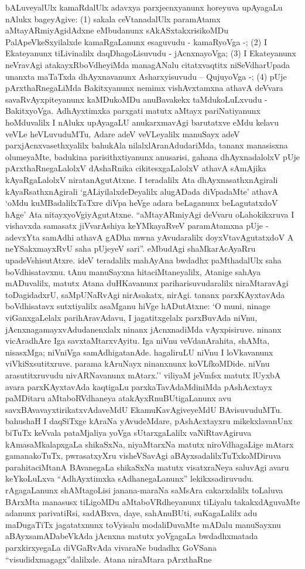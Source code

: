 bALuveyalUlx kamaRdalUlx adavxya parxjecnxyanunx horeyuva upAyagaLu nAlukx bageyAgive: {\rm(1)} sakala ceVtanadalUlx paramAtamx aMtayARmiyAgidAdxne eMbudanunx sAkASxtakxrisikoMDu PalApeVkeSxyilalxde kamaRgaLanunx esaguvudu - kamaRyoVga -; {\rm(2)} I Ekateyanunx tiLivinalilx daqDhagoLisuvudu - jAcnxnayoVga; {\rm(3)} I Ekateyanunx neVravAgi atakayxRboVdheyiMda managANalu citatxvaqtitx niSeVdharUpada unanxta maTaTxda dhAyxnavanunx Asharxyisuvudu -- QujuyoVga -; {\rm(4)} pUje pArxthaRnegaLiMda Bakitxyanunx nemimx vishAvxtamxna athavA deVvara savaRvAyxpiteyanunx kaMDukoMDu anuBavakekx taMdukoLuLxvudu - BakitxyoVga. AdhAyxtimxka parxgati matutx aMtayx pariNatiyanunx hoMduvalilx I nAlukx upAyagaLU anukarxmavAgi barutatxve eMdu kelavu veVLe heVLuvuduMTu, Adare adeV veVLeyalilx manuSayx adeV parxjAcnxvasethxyalilx bahukAla nilalxlAranAdudariMda, tananx manasisxna olumeyaMte, badukina parisithxtiyanunx anusarisi, gahana dhAyxnadalolxV pUje pArxthaRnegaLalolxV dAshaRnika cikitesxgaLalolxV athavA sAmAjika kAyaRgaLalolxV niratanAgutAtxne. I teradalilx Ata dhAyxnasathxnAgirali kAyaRsathxnAgirali `gALiyilalxdeDeyalilx alugADada diVpadaMte' athavA `oMdu kuMBadalilxTaTxre diVpa heVge adara beLaganunx beLagutatxdoV hAge' Ata nitayxyoVgiyAgutAtxne. ``aMtayARmiyAgi deVvaru oLahokikxruva I vishavxda samasatx jiVvarAshiya keYMkayaRveV paramAtamxna pUje - adevxYta samAdhi athavA gADha mwna yAvudaralilx doyxVtavAgutatxdoV A neYSakxmayxRvU saha pUjeyeV sari''. eMbudAgi shaMkarAcAyaRru upadeVshisutAtxre. ideV teradalilx mahAyAna bwdadhx paMthadalUlx saha boVdhisatavxnu. tAnu manuSayxna hitaciMtaneyalilx, Atanige sahAya mADuvalilx, matutx Atana duHKavanunx pariharisuvudaralilx niraMtaravAgi toDagidadxrU, saMpUNaRvAgi nirAsakatx, nirAgi. tananx parxKAyxtavAda boVdhisatavx sutxtiyalilx asaMganu hiVge hADutAtxne: `O muni, ninage viGanxgaLelalx parihAravAdavu, I jagatitxgelalx parxBuvAda niVnu, jAcnxnagamayxvAdudanenxlalx ninanx jAcnxnadiMda vAyxpisiruve. ninanx vicAradhAre Iga savxtaMtarxvAyitu. Iga niVnu veVdanArahita, shAMta, nisasxMga; niVniVga samAdhigatanAde. hagaliruLU niVnu I loVkavanunx viVkiSxsutitxruve. parama kAruNayx ninanxnunx koVLfkoMDide. niVnu arasutitxruvudu nivARNavanunx mAtarx.'' viliyaM jeVmfsx matutx lUyxbA avara parxKAyxtavAda kaqtigaLu parxkaTavAdaMdiniMda pAshAcxtayx paMDitaru aMtaboRVdhaneya atakAyxRnuBUtigaLanunx avu savxBAvavayxtirikatxvAdaveMdU EkamuKavAgiveyeMdU BAvisuvuduMTu. bahushaH I daqSiTxge kAraNa yAvudeMdare, pAshAcxtayxru mikekxlavanUnx biTuTx keVvala pataMjaliya yoVga sUtarxgaLalilx vaNiRtavAgiruva kAmasaMkalapxgaLa shikaSxNa, niyaMtarxNa matutx niroVdhagaLige mAtarx gamanakoTuTx, pwrasatxyXru visheVSavAgi aBAyxsadalilxTuTxkoMDiruva parahitaciMtanA BAvanegaLa shikaSxNa matutx visatxraNeya saluvAgi avaru keYkoLuLxva ``AdhAyxtimxka sAdhanegaLanunx'' lekikxsadiruvudu. rAgagaLanunx shAMtagoLisi janana-maraNa saMsAra cakarxdalilx toLaluva BArxMta manasusx tiLigoMDu aMtaboVRdheyanunx tiLiyalu takakxdAguvaMte adanunx parivatiRsi, sadABxva, daye, sahAnuBUti, suKagaLalilx adu maDugaTiTx jagatatxnunx toVyisalu modaliDuvaMte mADalu manuSayxnu aBAyxsamADabeVkAda jAcnxna matutx yoVgagaLa bwdadhxmatada parxkirxyegaLa diVGaRvAda vivaraNe budadhx GoVSana ``visudidxmagagx''dalilxde. Atana niraMtara pArxthaRne 